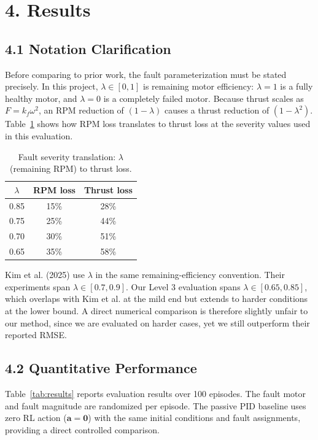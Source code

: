 \documentclass[12pt,letterpaper]{article}
\begin{document}
\section*{4. Results}

\subsection*{4.1 Notation Clarification}

Before comparing to prior work, the fault parameterization must be stated precisely. In this project, $\lambda \in [0, 1]$ is remaining motor efficiency: $\lambda = 1$ is a fully healthy motor, and $\lambda = 0$ is a completely failed motor. Because thrust scales as $F = k_f \omega^2$, an RPM reduction of $(1 - \lambda)$ causes a thrust reduction of $(1 - \lambda^2)$. Table~\ref{tab:notation} shows how RPM loss translates to thrust loss at the severity values used in this evaluation.

\begin{table}[h]
\centering
\caption{Fault severity translation: $\lambda$ (remaining RPM) to thrust loss.}
\label{tab:notation}
\begin{tabular}{ccc}
\toprule
$\lambda$ & RPM loss & Thrust loss \\
\midrule
0.85 & 15\% & 28\% \\
0.75 & 25\% & 44\% \\
0.70 & 30\% & 51\% \\
0.65 & 35\% & 58\% \\
\bottomrule
\end{tabular}
\end{table}

Kim et al. (2025) use $\lambda$ in the same remaining-efficiency convention. Their experiments span $\lambda \in [0.7, 0.9]$. Our Level 3 evaluation spans $\lambda \in [0.65, 0.85]$, which overlaps with Kim et al. at the mild end but extends to harder conditions at the lower bound. A direct numerical comparison is therefore slightly unfair to our method, since we are evaluated on harder cases, yet we still outperform their reported RMSE.

\subsection*{4.2 Quantitative Performance}

Table~\ref{tab:results} reports evaluation results over 100 episodes. The fault motor and fault magnitude are randomized per episode. The passive PID baseline uses zero RL action ($\mathbf{a} = \mathbf{0}$) with the same initial conditions and fault assignments, providing a direct controlled comparison.
\end{document}
